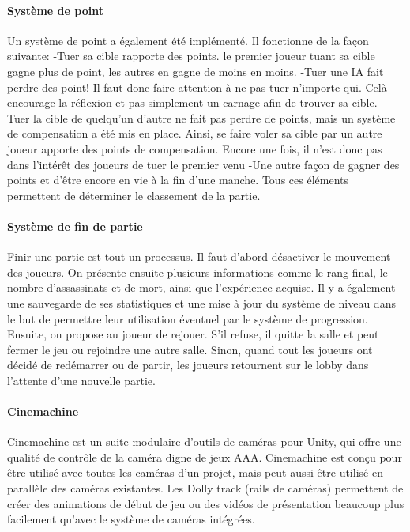 		\paragraph{Système de point}

			Un système de point a également été implémenté. Il fonctionne de la façon suivante:
				-Tuer sa cible rapporte des points. le premier joueur tuant sa cible gagne plus de point, les autres en gagne de moins en moins.
				-Tuer une IA fait perdre des point! Il faut donc faire attention à ne pas tuer n'importe qui. Celà encourage la réflexion et pas simplement un carnage afin de trouver sa cible.
				-Tuer la cible de quelqu'un d'autre ne fait pas perdre de points, mais un système de compensation a été mis en place. Ainsi, se faire voler sa cible par un autre joueur apporte des points de compensation. Encore une fois, il n'est donc pas dans l'intérêt 
				des joueurs de tuer le premier venu
				-Une autre façon de gagner des points et d'être encore en vie à la fin d'une manche.
			Tous ces éléments permettent de déterminer le classement de la partie.
	

		\paragraph{Système de fin de partie}

			Finir une partie est tout un processus. Il faut d'abord désactiver le mouvement des joueurs.
			On présente ensuite plusieurs informations comme le rang final, le nombre d'assassinats
			et de mort, ainsi que l'expérience acquise. Il y a également une sauvegarde de ses statistiques et une mise à jour du système
			de niveau dans le but de permettre leur utilisation éventuel par le système de progression.
			Ensuite, on propose au joueur de rejouer. S'il refuse, il quitte la salle et peut fermer le jeu ou rejoindre une autre salle.
			Sinon, quand tout les joueurs ont décidé de redémarrer ou de partir, les joueurs retournent 
			sur le lobby dans l'attente d'une nouvelle partie.


		\paragraph{Cinemachine}

			Cinemachine est un suite modulaire d'outils de caméras pour Unity, qui offre 
			une qualité de contrôle de la caméra digne de jeux AAA. Cinemachine est conçu pour être utilisé 
			avec toutes les caméras d'un projet, mais peut aussi être utilisé en parallèle des caméras existantes. 
			Les Dolly track (rails de caméras) permettent de créer des animations de début de jeu ou 
			des vidéos de présentation beaucoup plus facilement qu'avec le système de caméras intégrées. 

